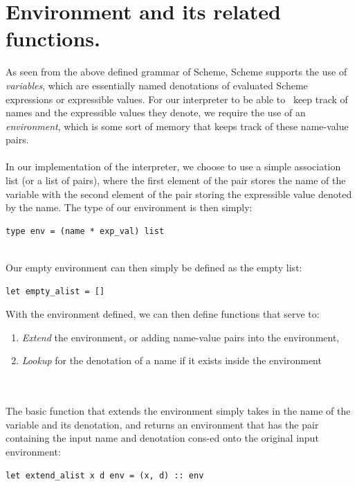 \section{Environment and its related functions.}
As seen from the above defined grammar of Scheme, Scheme supports the use of \textit{variables}, which are essentially named denotations of evaluated Scheme expressions or expressible values. For our interpreter to be able to \
keep track of names and the expressible values they denote, we require the use of an \textit{environment}, which is some sort of memory that keeps track of these name-value pairs. 
\\
\\
In our implementation of the interpreter, we choose to use a simple association list (or a list of pairs), where the first element of the pair stores the name of the variable with the second element of the pair storing the 
expressible value denoted by the name. The type of our environment is then simply:
\begin{small}
\begin{verbatim}
type env = (name * exp_val) list
\end{verbatim}
\end{small}
\\
Our empty environment can then simply be defined as the empty list:
\begin{small}
\begin{verbatim}
let empty_alist = []
\end{verbatim}
\end{small}
With the environment defined, we can then define functions that serve to:
\begin{enumerate}
   \item \textit{Extend} the environment, or adding name-value pairs into the environment,
   \item \textit{Lookup} for the denotation of a name if it exists inside the environment
\end{enumerate}
\\
\\
The basic function that extends the environment simply takes in the name of the variable and its denotation, and returns an environment that has the pair containing the input name and denotation cons-ed onto the original 
input environment:
\begin{small}
\begin{verbatim}
let extend_alist x d env = (x, d) :: env
\end{verbatim}
\end{small}
